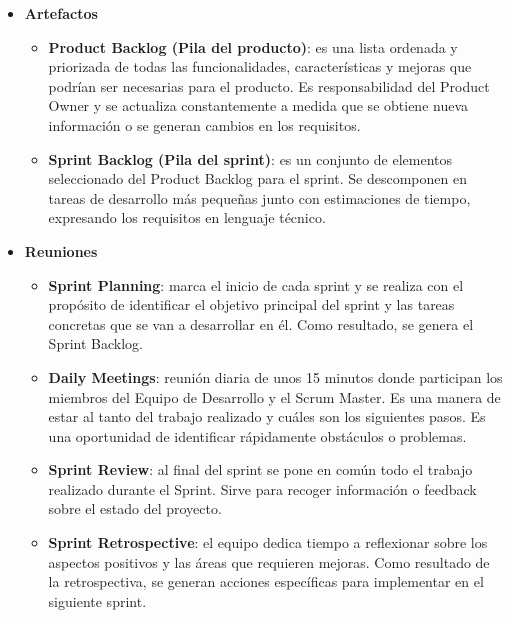 \begin{itemize}
    \item \textbf{Artefactos}
    \begin{itemize}
        \item \textbf{Product Backlog (Pila del producto)}: es una lista ordenada y priorizada de todas las funcionalidades, características y mejoras que podrían ser necesarias para el producto. Es responsabilidad del Product Owner y se actualiza constantemente a medida que se obtiene nueva información o se generan cambios en los requisitos.
        \item \textbf{Sprint Backlog (Pila del sprint)}: es un conjunto de elementos seleccionado del Product Backlog para el sprint. Se descomponen en tareas de desarrollo más pequeñas junto con estimaciones de tiempo, expresando los requisitos en lenguaje técnico.
    \end{itemize}
        

    \item \textbf{Reuniones}
    \begin{itemize}
        \item \textbf{Sprint Planning}: marca el inicio de cada sprint y se realiza con el propósito de identificar el objetivo principal del sprint y las tareas concretas que se van a desarrollar en él. Como resultado, se genera el Sprint Backlog.
        \item \textbf{Daily Meetings}: reunión diaria de unos 15 minutos donde participan los miembros del Equipo de Desarrollo y el Scrum Master. Es una manera de estar al tanto del trabajo realizado y cuáles son los siguientes pasos. Es una oportunidad de identificar rápidamente obstáculos o problemas.
        \item \textbf{Sprint Review}: al final del sprint se pone en común todo el trabajo realizado durante el Sprint. Sirve para recoger información o feedback sobre el estado del proyecto.
        \item \textbf{Sprint Retrospective}: el equipo dedica tiempo a reflexionar sobre los aspectos positivos y las áreas que requieren mejoras. Como resultado de la retrospectiva, se generan acciones específicas para implementar en el siguiente sprint.
    \end{itemize}


\end{itemize}
